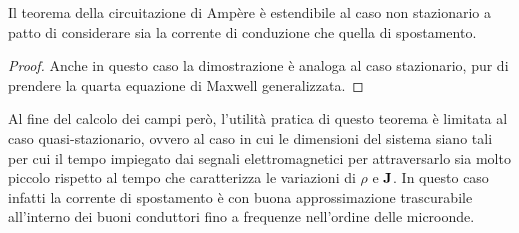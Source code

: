 \begin{obs}
    Il teorema della circuitazione di Ampère è estendibile al caso non stazionario a patto di considerare sia la corrente di
    conduzione che quella di spostamento.
\end{obs}
\begin{proof}
    Anche in questo caso la dimostrazione è analoga al caso stazionario, pur di prendere la quarta equazione di
    Maxwell generalizzata.
\end{proof}
Al fine del calcolo dei campi però, l'utilità pratica di questo teorema è limitata al caso quasi-stazionario,
ovvero al caso in cui le dimensioni del sistema siano tali per cui il tempo impiegato dai segnali
elettromagnetici per attraversarlo sia molto piccolo rispetto al tempo che caratterizza le variazioni di
$\rho$ e $\vb{J}$. In questo caso infatti la corrente di spostamento è con buona approssimazione trascurabile all'interno
dei buoni conduttori fino a frequenze nell'ordine delle microonde.
